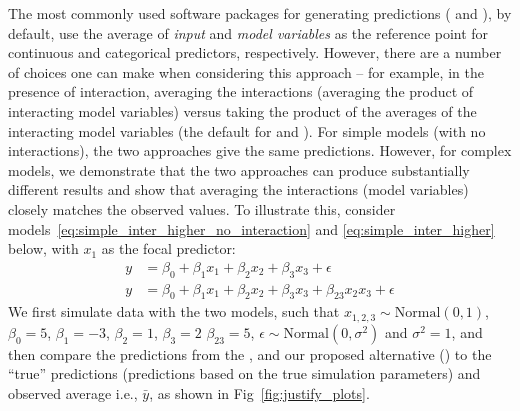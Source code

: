 The most commonly used  software packages for generating predictions ( and ), by default, use the average of \emph{input} and \emph{model variables} as the reference point for continuous and categorical predictors, respectively. However, there are a number of choices one can make when considering this approach -- for example, in the presence of interaction, averaging the interactions (averaging the product of interacting model variables) versus taking the product of the averages of the interacting model variables (the default for  and ). For simple models (with no interactions), the two approaches give the same predictions. However, for complex models, we demonstrate that the two approaches can produce substantially different results and show that averaging the interactions (model variables) closely matches the observed values. To illustrate this, consider models~\ref{eq:simple_inter_higher_no_interaction} and \ref{eq:simple_inter_higher} below, with $x_1$ as the focal predictor:
%
\begin{align}
y &= \beta_0 + \beta_1x_1 + \beta_2x_2 + \beta_3x_3 + \epsilon \label{eq:simple_inter_higher_no_interaction}\\
y &= \beta_0 + \beta_1x_1 + \beta_2x_2 + \beta_3x_3 + \beta_{23}x_2x_3 + \epsilon \label{eq:simple_inter_higher}
\end{align}
%
We first simulate data with the two models, such that $x_{1,2,3} \sim \mathrm{Normal}(0, 1)$, $\beta_0 = 5$, $\beta_1 = -3$, $\beta_2 = 1$, $\beta_3 = 2$ $\beta_{23} = 5$, $\epsilon \sim \mathrm{Normal}(0, \sigma^2)$ and $\sigma^2 = 1$, and then compare the predictions from the ,  and our proposed alternative () to the ``true'' predictions (predictions based on the true simulation parameters) and observed average i.e., $\bar{y}$, as shown in Fig~\ref{fig:justify_plots}.
%
